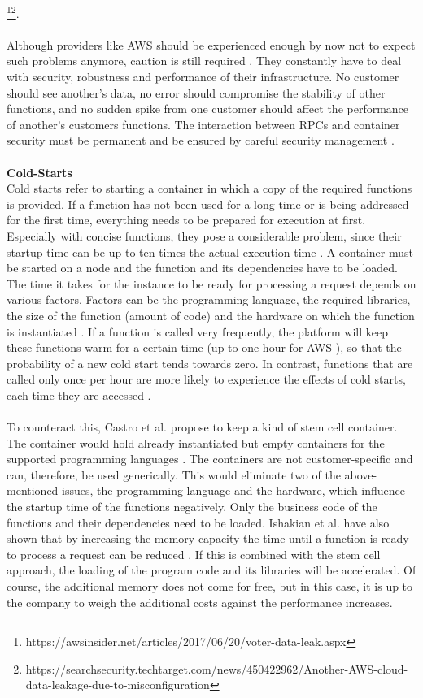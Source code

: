 \documentclass[a4paper,twoside,11pt, pagesize]{scrartcl}
\begin{document}
\begin{spacing}{1.2}
\footnote{https://awsinsider.net/articles/2017/06/20/voter-data-leak.aspx}\footnote{https://searchsecurity.techtarget.com/news/450422962/Another-AWS-cloud-data-leakage-due-to-misconfiguration}.\\\\ Although providers like AWS should be experienced enough by now not to expect such problems anymore, caution is still required \cite{fowler2018serverless}. They constantly have to deal with security, robustness and performance of their infrastructure. No customer should see another's data, no error should compromise the stability of other functions, and no sudden spike from one customer should affect the performance of another's customers functions. The interaction between RPCs and container security must be permanent and be ensured by careful security management \cite{mcgrath2017serverless}.\\\\ \textbf{Cold-Starts}\\ Cold starts refer to starting a container in which a copy of the required functions is provided. If a function has not been used for a long time or is being addressed for the first time, everything needs to be prepared for execution at first. Especially with concise functions, they pose a considerable problem, since their startup time can be up to ten times the actual execution time \cite{shahrad2019architectural}. A container must be started on a node and the function and its dependencies have to be loaded. The time it takes for the instance to be ready for processing a request depends on various factors. Factors can be the programming language, the required libraries, the size of the function (amount of code) and the hardware on which the function is instantiated \cite{shafiei2020serverless} \cite{jonas2019cloud}. If a function is called very frequently, the platform will keep these functions \glqq warm\grqq{} for a certain time (up to one hour for AWS \cite{roberts2017serverless}), so that the probability of a new cold start tends towards zero. In contrast, functions that are called only once per hour are more likely to experience the effects of cold starts, each time they are accessed \cite{roberts2017serverless}.\\\\ To counteract this, Castro et al. propose to keep a kind of stem cell container. The container would hold already instantiated but empty containers for the supported programming languages \cite{castro2019server}. The containers are not customer-specific and can, therefore, be used generically. This would eliminate two of the above-mentioned issues, the programming language and the hardware, which influence the startup time of the functions negatively. Only the business code of the functions and their dependencies need to be loaded. Ishakian et al. have also shown that by increasing the memory capacity the time until a function is ready to process a request can be reduced \cite{ishakian2018serving}. If this is combined with the stem cell approach, the loading of the program code and its libraries will be accelerated. Of course, the additional memory does not come for free, but in this case, it is up to the company to weigh the additional costs against the performance increases.

\end{spacing}
\end{document}
